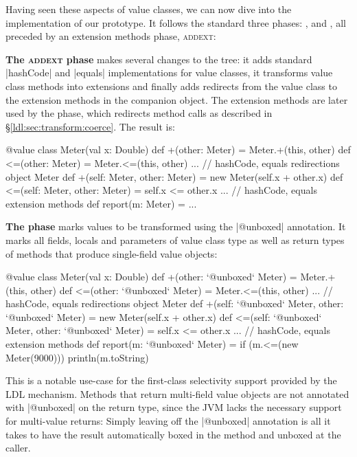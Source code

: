 Having seen these aspects of value classes, we can now dive into the implementation of our prototype. It follows the standard three phases: \inject{}, \coerce{} and \commit{}, all preceded by an extension methods phase, \textsc{addext}:

\textbf{The \textsc{addext} phase} makes several changes to the tree: it adds standard |hashCode| and |equals| implementations for value classes, it transforms value class methods into extensions and finally adds redirects from the value class to the extension methods in the companion object. The extension methods are later used by the \coerce{} phase, which redirects method calls as described in \S\ref{ldl:sec:transform:coerce}. The result is:

\begin{lstlisting-nobreak}
 @value class Meter(val x: Double) {
   def +(other: Meter) = Meter.+(this, other)
   def <=(other: Meter) = Meter.<=(this, other)
   ... // hashCode, equals redirections
 }
 object Meter {
   def +(self: Meter, other: Meter) =
     new Meter(self.x + other.x)
   def <=(self: Meter, other: Meter) =
     self.x <= other.x
   ... // hashCode, equals extension methods
 }
 def report(m: Meter) = ...
\end{lstlisting-nobreak}

\textbf{The \inject{} phase} marks values to be transformed using the |@unboxed| annotation. It marks all fields, locals and parameters of value class type as well as return types of methods that produce single-field value objects:

\begin{lstlisting-nobreak}
 @value class Meter(val x: Double) {
   def +(other: `@unboxed` Meter) =
     Meter.+(this, other)
   def <=(other: `@unboxed` Meter) =
     Meter.<=(this, other)
   ... // hashCode, equals redirections
 }
 object Meter {
   def +(self: `@unboxed` Meter, other: `@unboxed` Meter) = new Meter(self.x + other.x)
   def <=(self: `@unboxed` Meter, other: `@unboxed` Meter) = self.x <= other.x
   ... // hashCode, equals extension methods
 }
 def report(m: `@unboxed` Meter) = {
   if (m.<=(new Meter(9000)))
     println(m.toString)
 }
\end{lstlisting-nobreak}

This is a notable use-case for the first-class selectivity support provided by the LDL mechanism. Methods that return multi-field value objects are not annotated with |@unboxed| on the return type, since the JVM lacks the necessary support for multi-value returns: Simply leaving off the |@unboxed| annotation is all it takes to have the result automatically boxed in the method and unboxed at the caller.

